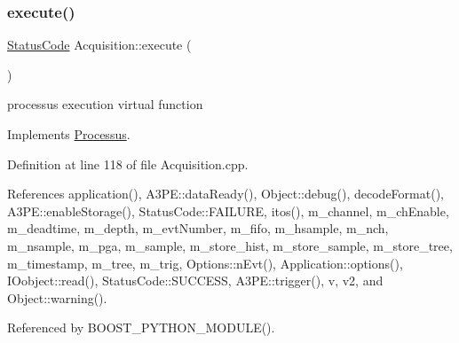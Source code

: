 \subsubsection{\texorpdfstring{execute()}{execute()}\hspace{0.1cm}{\footnotesize\ttfamily [2/2]}}
{\footnotesize\ttfamily \hyperlink{classStatusCode}{Status\+Code} Acquisition\+::execute (\begin{DoxyParamCaption}{ }\end{DoxyParamCaption})\hspace{0.3cm}{\ttfamily [virtual]}}

processus execution virtual function 

Implements \hyperlink{classProcessus_a63767a63a1fb0055c5aa45b21a4a5d58}{Processus}.



Definition at line 118 of file Acquisition.\+cpp.



References application(), A3\+P\+E\+::data\+Ready(), Object\+::debug(), decode\+Format(), A3\+P\+E\+::enable\+Storage(), Status\+Code\+::\+F\+A\+I\+L\+U\+RE, itos(), m\+\_\+channel, m\+\_\+ch\+Enable, m\+\_\+deadtime, m\+\_\+depth, m\+\_\+evt\+Number, m\+\_\+fifo, m\+\_\+hsample, m\+\_\+nch, m\+\_\+nsample, m\+\_\+pga, m\+\_\+sample, m\+\_\+store\+\_\+hist, m\+\_\+store\+\_\+sample, m\+\_\+store\+\_\+tree, m\+\_\+timestamp, m\+\_\+tree, m\+\_\+trig, Options\+::n\+Evt(), Application\+::options(), I\+Oobject\+::read(), Status\+Code\+::\+S\+U\+C\+C\+E\+SS, A3\+P\+E\+::trigger(), v, v2, and Object\+::warning().



Referenced by B\+O\+O\+S\+T\+\_\+\+P\+Y\+T\+H\+O\+N\+\_\+\+M\+O\+D\+U\+L\+E().


